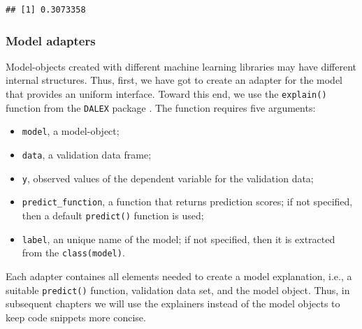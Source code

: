 \documentclass[12pt,]{krantz}
\providecommand{\tightlist}{%
  \setlength{\itemsep}{0pt}\setlength{\parskip}{0pt}}
\begin{document}
\begin{verbatim}
## [1] 0.3073358
\end{verbatim}

\hypertarget{ExplainersTitanicRCode}{%
\subsubsection{Model adapters}\label{ExplainersTitanicRCode}}

Model-objects created with different machine learning libraries may have different internal structures. Thus, first, we have got to create an adapter for the model that provides an uniform interface. Toward this end, we use the \texttt{explain()} function from the \texttt{DALEX} package \citep{DALEX}. The function requires five arguments:

\begin{itemize}
\tightlist
\item
  \texttt{model}, a model-object;
\item
  \texttt{data}, a validation data frame;
\item
  \texttt{y}, observed values of the dependent variable for the validation data;
\item
  \texttt{predict\_function}, a function that returns prediction scores; if not specified, then a default \texttt{predict()} function is used;
\item
  \texttt{label}, an unique name of the model; if not specified, then it is extracted from the \texttt{class(model)}.
\end{itemize}

Each adapter containes all elements needed to create a model explanation, i.e., a suitable \texttt{predict()} function, validation data set, and the model object. Thus, in subsequent chapters we will use the explainers instead of the model objects to keep code snippets more concise.
\end{document}
